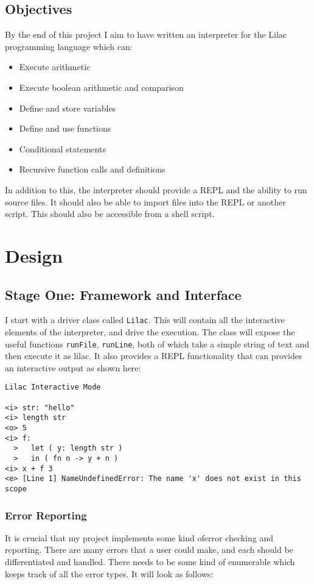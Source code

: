 \documentclass[a4paper, 11pt]{report}
\begin{document}
\section{Objectives}\label{sec:objectives}
By the end of this project I aim to have written an interpreter for the Lilac programming language which can:\\
\begin{itemize}
\item 
Execute arithmetic
\item 
Execute boolean arithmetic and comparison
\item 
Define and store variables
\item
Define and use functions
\item 
Conditional statements
\item 
Recursive function calls and definitions
\end{itemize}

In addition to this, the interpreter should provide a REPL and the ability to run source files. It should also be able to import files into the REPL or another script. This should also be accessible from a shell script.

\chapter{Design}\label{sec:design}
\section{Stage One: Framework and Interface}\label{sec:stage-one-framework-and-interface}
I start with a driver class called \verb|Lilac|. This will contain all the interactive elements of the interpreter, and drive the execution. The class will expose the useful functions \verb|runFile|, \verb|runLine|, both of which take a simple string of text and then execute it as lilac. It also provides a REPL functionality that can provides an interactive output as shown here:\\
\begin{verbatim}
Lilac Interactive Mode

<i> str: "hello"
<i> length str
<o> 5
<i> f:
  >   let ( y: length str )
  >   in ( fn n -> y + n )
<i> x + f 3
<e> [Line 1] NameUndefinedError: The name 'x' does not exist in this scope
\end{verbatim}
\subsection{Error Reporting}\label{sec:error-reporting}
It is crucial that my project implements some kind oferror checking and reporting. There are many errors that a user could make, and each should be differentiated and handled. There needs to be some kind of enumerable which keeps track of all the error types. It will look as follows:
\end{document}
